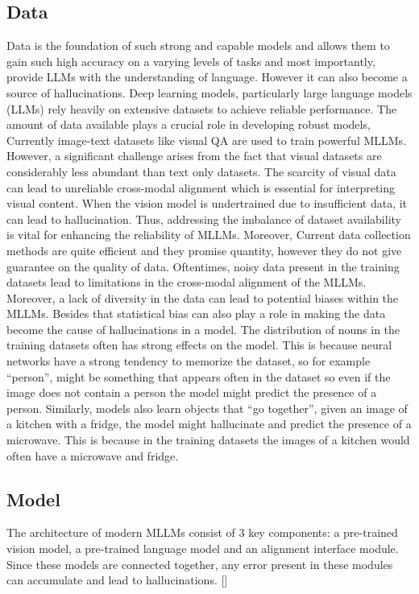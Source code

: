 \documentclass[twocolumn, 9pt]{extarticle}
\begin{document}
\subsection{Data}
Data is the foundation of such strong and capable models and allows them to gain such high accuracy on a varying levels of tasks and most importantly, provide LLMs with the understanding of language. However it can also become a source of hallucinations. 
Deep learning models, particularly large language models (LLMs) rely heavily on extensive datasets to achieve reliable performance. The amount of data available plays a crucial role in developing robust models, Currently image-text datasets like visual QA are used to train powerful MLLMs. However, a significant challenge arises from the fact that visual datasets are considerably less abundant than text only datasets. The scarcity of visual data can lead to unreliable cross-modal alignment which is essential for interpreting visual content. When the vision model is undertrained due to insufficient data, it can lead to hallucination. Thus, addressing the imbalance of dataset availability is vital for enhancing the reliability of MLLMs.  
Moreover, Current data collection methods are quite efficient and they promise quantity, however they do not give guarantee on the quality of data. Oftentimes, noisy data present in the training datasets lead to limitations in the cross-modal alignment of the MLLMs. Moreover, a lack of diversity in the data can lead to potential biases within the MLLMs.  Besides that statistical bias can also play a role in making the data become the cause of hallucinations in a model. The distribution of nouns in the training datasets often has strong effects on the model. This is because neural networks have a strong tendency to memorize the dataset, so for example “person”, might be something that appears often in the dataset so even if the image does not contain a person the model might predict the presence of a person. Similarly, models also learn objects that “go together”, given an image of a kitchen with a fridge, the model might hallucinate and predict the presence of a microwave. This is because in the training datasets the images of a kitchen would often have a microwave and fridge. 

\subsection{Model}
The architecture of modern MLLMs consist of 3 key components: a pre-trained vision model, a pre-trained language model and an alignment interface module. Since these models are connected together, any error present in these modules can accumulate and lead to hallucinations.  []
\end{document}
